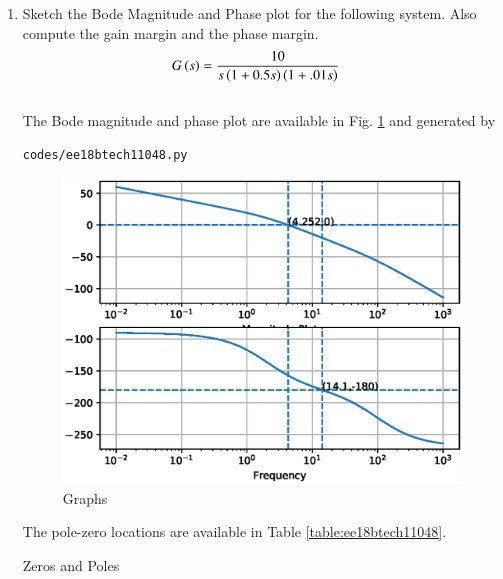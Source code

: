  
\begin{enumerate}[label=\thesection.\arabic*.,ref=\thesection.\theenumi]

\item Sketch the Bode Magnitude and Phase plot for the following system. Also compute the gain margin and the phase margin.
\begin{align}
G\left(s\right) &= \frac{10}{s\left(1+0.5s\right)\left(1+.01s\right)}
\label{eq:ee18btech11048_2}
\end{align}
\\
\solution The Bode magnitude and phase plot are available in  Fig. \ref{fig:ee18btech11048} and generated by \begin{lstlisting}
codes/ee18btech11048.py
\end{lstlisting}

\begin{figure}[!h]
\centering
  \includegraphics[width=\columnwidth]{./figs/ee18btech11048.eps}
  \caption{Graphs}
  \label{fig:ee18btech11048}
\end{figure}
The pole-zero locations are available in Table \ref{table:ee18btech11048}.
\begin{table}[!ht]
\centering

\caption{Zeros and Poles}
\label{table:ee18btech11048}
\end{table}




\end{enumerate}

